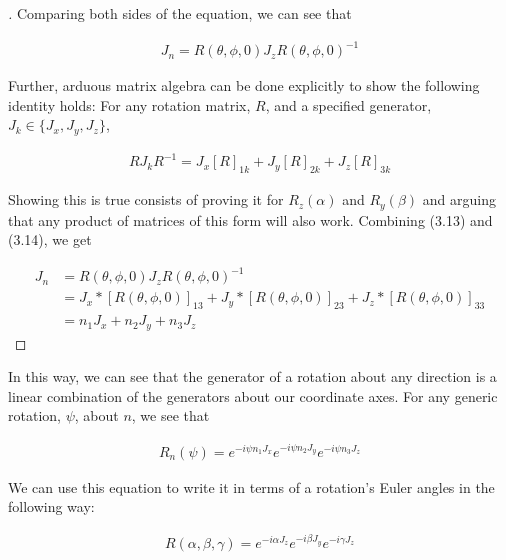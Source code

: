 \documentclass[10pt]{ucthesis}
\begin{document}
\begin{proof}[\cite{Tung}]
Comparing both sides of the equation, we can see that 

\begin{equation}
	\begin{aligned}
		J_n = R(\theta,\phi,0)J_z R(\theta,\phi,0)^{-1}
	\end{aligned}
\end{equation}

Further, arduous matrix algebra can be done explicitly to show the following identity holds: For any rotation matrix, $R$, and a specified generator, $J_k\in\{J_x,J_y,J_z\}$,

\begin{equation}
	\begin{aligned}
		RJ_kR^{-1} = J_x [R]_{1k} + J_y  [R]_{2k}  +J_z  [R]_{3k} 
	\end{aligned}
\end{equation}

Showing this is true consists of proving it for $R_z(\alpha)$ and $R_y(\beta)$ and arguing that any product of matrices of this form will also work. Combining (3.13) and (3.14), we get 

\begin{equation}
	\begin{aligned}
		J_n &= R(\theta,\phi,0)J_z R(\theta,\phi,0)^{-1} \\
			&= J_x * [R(\theta,\phi,0)]_{13} + J_y * [R(\theta,\phi,0)]_{23}  +J_z * [R(\theta,\phi,0)]_{33}\\
			 &= n_1J_x + n_2J_y + n_3J_z 
	\end{aligned}
\end{equation} 
\end{proof}

In this way, we can see that the generator of a rotation about any direction is a linear combination of the generators about our coordinate axes. For any generic rotation, $\psi$, about $n$, we see that 

\begin{equation}
	\begin{aligned}
		R_n(\psi) = e^{-i\psi n_1J_x}e^{-i\psi n_2J_y}e^{-i\psi n_3J_z}
	\end{aligned}
\end{equation} 

We can use this equation to write it in terms of a rotation's Euler angles in the following way:

\begin{equation}
	\begin{aligned}
		R(\alpha,\beta,\gamma) = e^{-i\alpha J_z}e^{-i\beta J_y}e^{-i\gamma J_z}
	\end{aligned}
\end{equation} 
\end{document}
